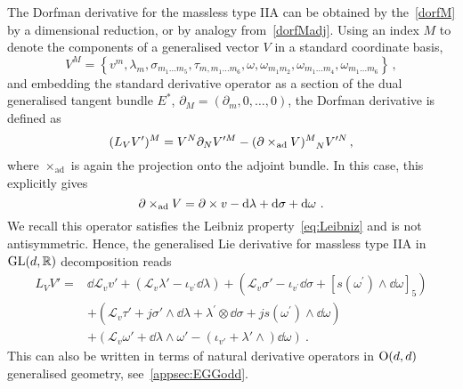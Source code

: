\documentclass[debug]{phd}
\begin{document}
					The Dorfman derivative for the massless type IIA can be obtained by the~\eqref{dorfM} by a dimensional reduction, or by analogy from~\eqref{dorfMadj}.
					Using an index $M$ to denote the components of a generalised vector $V$ in a standard coordinate basis, 
							\begin{equation}
								V^M = \left\{v^m , \lambda_m, \sigma_{m_1\ldots m_5}, \tau_{m,m_1\ldots m_6} , \omega, \omega_{m_1m_2}, \omega_{m_1\ldots m_4}, \omega_{m_1\ldots m_6}\right\} \, ,
							\end{equation}
					and embedding the standard derivative operator as a section of the dual generalised tangent bundle $E^*$, $\partial_M = (\partial_m, 0, \ldots,0)$, the Dorfman derivative is defined as~\cite{waldram4}
							\begin{equation}\label{eq:Liedefg}
								(L_V V')^M = V^N \partial_N V^{\prime M} - (\partial \times_{\rm ad} V)^M_{\phantom{M}N} V^{\prime N}\, , 
							\end{equation}
					where $ \times_{\mathrm{ad}}$ is again the projection onto the adjoint bundle.
					In this case, this explicitly gives 
							\begin{equation}
								\partial \times_{\mathrm{ad}} V = \partial \times v -\mathrm{d} \lambda + \mathrm{d} \sigma + \mathrm{d} \omega\ .
							\end{equation}
					We recall this operator satisfies the Leibniz property~\eqref{eq:Leibniz} and is not antisymmetric.
					Hence, the generalised Lie derivative for massless type IIA in $\mathrm{GL}(d,\mathbb{R})$ decomposition reads
							\begin{equation}\label{dorfIIA}
								\begin{split}
									L_V V' =&\dd \mathcal{L}_v v' + \left(\mathcal{L}_v \lambda' - \iota_{v^\prime} \dd\lambda \right) + \left( \mathcal{L}_v \sigma' - \iota_{v^\prime}\dd\sigma + [s(\omega^\prime) \wedge \dd\omega]_5\right) \\
											& + \left(\mathcal{L}_v \tau' + j \sigma' \wedge \dd\lambda + \lambda^\prime \otimes \dd\sigma + j s(\omega^\prime) \wedge \dd\omega \right) \\
											& + \left(\mathcal{L}_v \omega' + \dd \lambda \wedge \omega' - (\iota_{v'}+ \lambda' \wedge)\dd\omega\right) \ .
								\end{split}
							\end{equation}
					This can also be written in terms of natural derivative operators in $\mathrm{O}(d,d)$ generalised geometry, see~\cref{appsec:EGGodd}.
					
\end{document}

